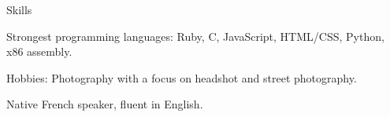 \documentclass{resume} %
\begin{document}

\begin{rSection}{Skills}
\begin{rList}
\item Strongest programming languages: Ruby, C, JavaScript, HTML/CSS, Python, x86 assembly.
\item Hobbies: Photography with a focus on headshot and street photography.
\item Native French speaker, fluent in English.
\end{rList}
\end{rSection}
\end{document}
